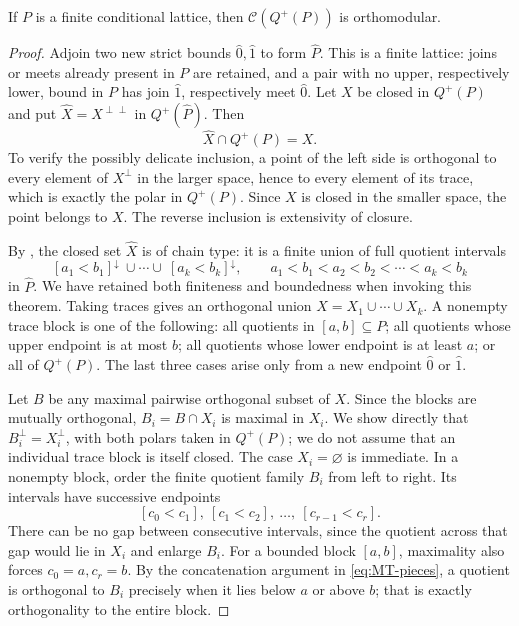 \begin{lemma}
\label{SA21-MT02}
If $P$ is a finite conditional lattice, then $\mathcal C(Q^+(P))$
is orthomodular.
\end{lemma}
\begin{proof}
Adjoin two new strict bounds $\widehat0,\widehat1$ to form
$\widehat P$. This is a finite lattice: joins or meets already present
in $P$ are retained, and a pair with no upper, respectively lower,
bound in $P$ has join $\widehat1$, respectively meet $\widehat0$.
Let $X$ be closed in $Q^+(P)$ and put
$\widehat X=X^{\perp\perp}$ in $Q^+(\widehat P)$.
Then
\begin{equation}
 \label{eq:MT-trace}
 \widehat X\cap Q^+(P)=X.
\end{equation}
To verify the possibly delicate inclusion, a point of the left side
is orthogonal to every element of $X^{\perp}$ in the larger space,
hence to every element of its trace, which is exactly the polar in
$Q^+(P)$. Since $X$ is closed in the smaller space, the point belongs
to $X$. The reverse inclusion is extensivity of closure.

By \citet[Theorem~4.10(a)$\Rightarrow$(b), p.~10]{Jenca2022}, the
closed set $\widehat X$ is of chain type: it is a finite union of
full quotient intervals
\[
 [a_1<b_1]^{\downarrow}\ \cup\cdots\cup\
 [a_k<b_k]^{\downarrow},
 \qquad a_1<b_1<a_2<b_2<\cdots<a_k<b_k
\]
in $\widehat P$. We have retained both finiteness and boundedness
when invoking this theorem. Taking traces gives an orthogonal union
$X=X_1\cup\cdots\cup X_k$. A nonempty trace block is one of the
following: all quotients in $[a,b]\subseteq P$; all quotients whose
upper endpoint is at most $b$; all quotients whose lower endpoint is
at least $a$; or all of $Q^+(P)$. The last three cases arise only from
a new endpoint $\widehat0$ or $\widehat1$.

Let $B$ be any maximal pairwise orthogonal subset of $X$. Since the
blocks are mutually orthogonal, $B_i=B\cap X_i$ is maximal in $X_i$.
We show directly that $B_i^{\perp}=X_i^{\perp}$, with both polars
taken in $Q^+(P)$; we do not assume that an individual trace block
is itself closed. The case $X_i=\varnothing$ is immediate. In a
nonempty block, order the finite quotient family $B_i$ from left to
right. Its intervals have successive endpoints
\[
 [c_0<c_1],\ [c_1<c_2],\ \ldots,\ [c_{r-1}<c_r].
\]
There can be no gap between consecutive intervals, since the quotient
across that gap would lie in $X_i$ and enlarge $B_i$.
For a bounded block $[a,b]$, maximality also forces $c_0=a,c_r=b$.
By the concatenation argument in \eqref{eq:MT-pieces}, a quotient is
orthogonal to $B_i$ precisely when it lies below $a$ or above $b$;
that is exactly orthogonality to the entire block.


\end{proof}
